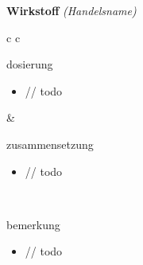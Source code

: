 \begin{frame}{
    \textbf{Wirkstoff}
    \textit{(Handelsname)}
}
    \begin{tabular}{c c}
        \begin{beamercolorbox}[wd=\boxwidth\textwidth,ht=\boxheight\textheight,sep=1em]{dosierung}
            \begin{itemize}
                \item // todo
            \end{itemize}
        \end{beamercolorbox} & 
        \begin{beamercolorbox}[wd=\boxwidth\textwidth,ht=\boxheight\textheight,sep=1em]{zusammensetzung}
            \begin{itemize}
                \item // todo
            \end{itemize}
        \end{beamercolorbox} \\
        \begin{beamercolorbox}[wd=\textwidth,ht=\boxheight\textheight,sep=1em]{bemerkung}
            \begin{itemize}
                \item // todo
            \end{itemize}
        \end{beamercolorbox} \\
    \end{tabular}
\end{frame}

